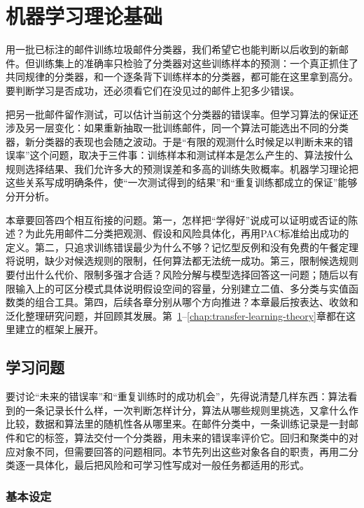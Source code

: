\chapter{机器学习理论基础}
\label{chap:statistical-learning-framework}

用一批已标注的邮件训练垃圾邮件分类器，我们希望它也能判断以后收到的新邮件。但训练集上的准确率只检验了分类器对这些训练样本的预测：一个真正抓住了共同规律的分类器，和一个逐条背下训练样本的分类器，都可能在这里拿到高分。要判断学习是否成功，还必须看它们在没见过的邮件上犯多少错误。

把另一批邮件留作测试，可以估计当前这个分类器的错误率。但学习算法的保证还涉及另一层变化：如果重新抽取一批训练邮件，同一个算法可能选出不同的分类器，新分类器的表现也会随之波动。于是“有限的观测什么时候足以判断未来的错误率”这个问题，取决于三件事：训练样本和测试样本是怎么产生的、算法按什么规则选择结果、我们允许多大的预测误差和多高的训练失败概率。机器学习理论把这些关系写成明确条件，使“一次测试得到的结果”和“重复训练都成立的保证”能够分开分析。

本章要回答四个相互衔接的问题。第一，怎样把“学得好”说成可以证明或否证的陈述？为此先用邮件二分类把观测、假设和风险具体化，再用PAC标准给出成功的定义。第二，只追求训练错误最少为什么不够？记忆型反例和没有免费的午餐定理将说明，缺少对候选规则的限制，任何算法都无法统一成功。第三，限制候选规则要付出什么代价、限制多强才合适？风险分解与模型选择回答这一问题；随后以有限输入上的可区分模式具体说明假设空间的容量，分别建立二值、多分类与实值函数类的组合工具。第四，后续各章分别从哪个方向推进？本章最后按表达、收敛和泛化整理研究问题，并回顾其发展。第~\ref{chap:statistical-learning-framework}--\ref{chap:transfer-learning-theory}章都在这里建立的框架上展开。

\section{学习问题}
\label{sec:learning-problem}
\label{sec:statistical-learning-problem}

要讨论“未来的错误率”和“重复训练时的成功机会”，先得说清楚几样东西：算法看到的一条记录长什么样，一次判断怎样计分，算法从哪些规则里挑选，又拿什么作比较，数据和算法里的随机性各从哪里来。在邮件分类中，一条训练记录是一封邮件和它的标签，算法交付一个分类器，用未来的错误率评价它。回归和聚类中的对应对象不同，但需要回答的问题相同。本节先列出这些对象各自的职责，再用二分类逐一具体化，最后把风险和可学习性写成对一般任务都适用的形式。

\subsection{基本设定}
\label{sec:learning-problem-basic-setting}

